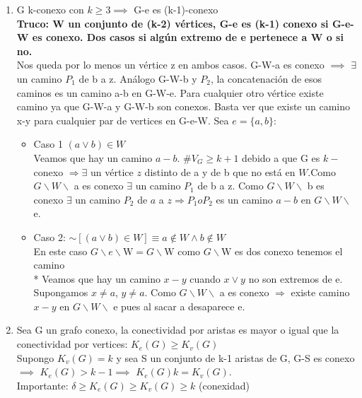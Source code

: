 \documentclass{article}
\begin{document}
\begin{enumerate}
    \item G k-conexo con $k\geq3\implies$ G-e es (k-1)-conexo \\
    \textbf{Truco: W un conjunto de (k-2) vértices, G-e es (k-1) conexo si G-e-W es conexo. Dos casos si algún extremo de e pertenece a W o si no.} \\
    Nos queda por lo menos un vértice z en ambos casos. G-W-a es conexo $\implies$ $\exists$ un camino $P_1$ de b a z. Análogo G-W-b y $P_2$, la concatenación de esos caminos es un camino a-b en G-W-e.
    Para cualquier otro vértice existe camino ya que G-W-a y G-W-b son conexos.
    Basta ver que existe un camino x-y para cualquier par de vertices en G-e-W. Sea $e=\{a,b\}:$
    \begin{itemize}
        \item Caso 1 $(a \vee b) \in W$ \\
        Veamos que hay un camino $a-b$. $\# V_{G} \geq k+1$ debido a que G es $k-$ conexo $\Rightarrow \exists$ un vértice $z$ distinto de a y de b que no está en $W$.Como $G \backslash W \backslash$ a es conexo $\exists$ un camino $P_{1}$ de b a z. Como $G \backslash W \backslash$ b es conexo $\exists$ un camino $P_{2}$ de $a$ a $z \Rightarrow P_{1} o P_{2}$ es un camino $a-b$ en $G \backslash W \backslash$ e.
        \item Caso 2: $\sim[(a \vee b) \in W] \equiv a \notin W \wedge b \notin W$ \\ En este caso $G \backslash e \backslash \mathrm{W}=G \backslash \mathrm{W}$ como $G \backslash \mathrm{W}$ es dos conexo tenemos el camino \\* 
        Veamos que hay un camino $x-y$ cuando $x \lor y$ no son extremos de e. Supongamos $x \neq a$, $y \neq a .$ Como $G \backslash W \backslash$ a es conexo $\Rightarrow$ existe camino $x-y$ en $G \backslash W \backslash$ e pues al sacar a desaparece e.
    \end{itemize}

    \item Sea G un grafo conexo, la conectividad por aristas es mayor o igual que la conectividad por vertices: $K_e(G)\geq K_v(G)$ \\
    Supongo $K_v(G) = k$ y sea S un conjunto de k-1 aristas de G, G-S es conexo $\implies$ $K_e(G)>k-1 \implies$ $K_e(G)k = K_v(G)$. \\
    Importante: $\delta \geq K_e(G) \geq K_v(G) \geq k$ (conexidad)
    

\end{enumerate}
\end{document}
